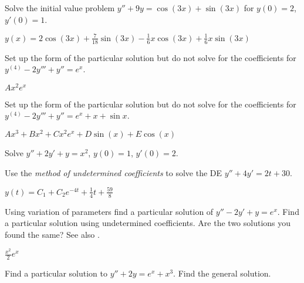\begin{exercise}
Solve the initial value problem
$y''+9y = \cos (3x) + \sin (3x)$ for $y(0) = 2$, $y'(0) = 1$.
\end{exercise}
\comboSol{%
}
{%
$y(x) = 2\cos(3x) + \frac{7}{18}\sin(3x) - \frac{1}{6}x\cos(3x) + \frac{1}{6}x\sin(3x)$
}

\begin{exercise}
Set up the form of the particular solution but do not solve
for the coefficients for $y^{(4)}-2y'''+y'' = e^x$.
\end{exercise}
\comboSol{%
}
{%
$Ax^2e^x$
}

\begin{exercise}
Set up the form of the particular solution but do not solve
for the coefficients for $y^{(4)}-2y'''+y'' = e^x + x + \sin x$.
\end{exercise}
\comboSol{%
}
{%
$Ax^3 + Bx^2 + Cx^2e^x + D\sin(x) + E\cos(x)$
}

\begin{exercise}\ansMark%
Solve $y''+2y'+y = x^2$, $y(0)=1$, $y'(0)=2$.
\end{exercise}

\begin{exercise}
Use the {\it method of undetermined coefficients} to solve the DE $y''+4y'=2t+30$. %
\end{exercise}
\comboSol{%
}
{%
$y(t) = C_1 + C_2e^{-4t} + \frac{1}{4}t + \frac{59}{8}$
}

\begin{exercise}
\pagebreak[2]
\leavevmode
\begin{tasks}
\task Using variation of parameters find a particular solution of
$y''-2y'+y = e^x$.
\task Find a particular solution using undetermined
coefficients.
\task Are the two solutions you found the same?
See also .
\end{tasks}
\end{exercise}
\comboSol{%
}
{%
$\frac{x^2}{2}e^x$
}

\begin{samepage}
\begin{exercise}\ansMark%
\leavevmode
\begin{tasks}
\task Find a particular solution to $y''+2y=e^x + x^3$.
\task Find the general solution.
\end{tasks}
\end{exercise}
\end{samepage}

